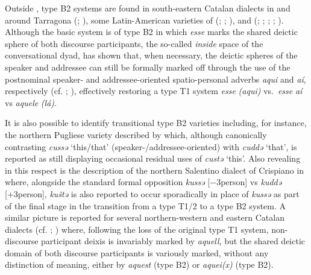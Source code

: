 \documentclass[output=paper]{langsci/langscibook}
\begin{document}
Outside , type B2 systems are found in south-eastern
Catalan dialects in and around Tarragona
(\citealt[141]{Badia-i-Margarit:1991a}; \citealt[501]{Badia-i-Margarit:1995a}),
some Latin-American varieties of  (\citealt[170]{Kany:1945a};
\citealt[434]{Zamora-Vicente:1967a}; \citealt[42, 44]{Stavinschi:2009a}), and
 (\citealt{Camara:1971a}; \citealt[114f]{Teyssier:1976a};
\citealt{Jungbluth:2000a}; \citealt[§5]{Jungbluth:2017a};
\citealt[317--319]{Jungbluth:2015a}). Although the basic 
system is of type B2 in which \emph{esse} marks the shared deictic
sphere of both discourse participants, the so-called \emph{inside} space of the
conversational dyad, \citet{Jungbluth:2000a} has shown that, when necessary,
the deictic spheres of the speaker and addressee can still be formally marked
off through the use of the postnominal speaker- and addressee-oriented
spatio-personal adverbs \emph{aqui} and \emph{aí}, respectively (cf.
\citealt[27--51]{Carvalho:1976a}; \citealt[317]{Jungbluth:2015a}), effectively
restoring a type T1 system \emph{esse} \emph{(aqui)} vs.\ \emph{esse} \emph{aí}
vs \emph{aquele} \emph{(lá)}.

It is also possible to identify transitional type B2 varieties
including, for instance, the northern Pugliese variety described by
\citet[201]{Imperio:1990a} which, although canonically contrasting \emph{cussə}
‘this/that’ (speaker-/addressee-oriented) with \emph{cuddə} ‘that’, is reported
as still displaying occasional residual uses of \emph{custə} ‘this’. Also
revealing in this respect is the description of the northern Salentino dialect
of Crispiano in \citet[155]{Mancarella:1998a} where, alongside the standard
formal opposition \emph{kussə} [−3person] vs \emph{kuddə}
[+3person], \emph{kuštə} is also reported to occur sporadically in place of
\emph{kussə} as part of the final stage in the transition from a type T1/2 to a
type B2 system. A similar picture is reported for several
northern-western and eastern Catalan dialects (cf.
\citealt[81]{Duarte-i-Montserrat:1986a}; \citealt[250]{Veny:1991a}) where,
following the loss of the original type T1 system, non-discourse participant
deixis is invariably marked by \emph{aquell}, but the shared deictic domain of
both discourse participants is variously marked, without any distinction of
meaning, either by \emph{aquest} (type B2) or \emph{aquei(x)} (type
B2).
\end{document}
